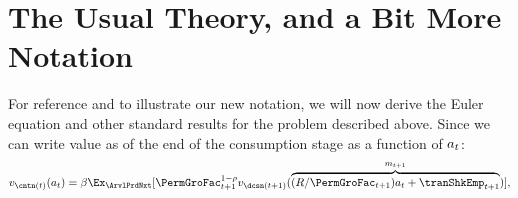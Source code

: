 
\hypertarget{the-usual-theory}{}
\section{The Usual Theory, and a Bit More Notation}\label{sec:the-usual-theory}


For reference and to illustrate our new notation, we will now derive the Euler equation and other standard results for the problem described above.
Since we can write value as of the end of the consumption stage as a function of $a_{t}$:
\hypertarget{eq-vCntnExpansion}{}
\begin{equation}\begin{gathered}\begin{aligned}
  \vFunc_{{\cntn}(\prdt)}(\aNrm_{\prdt}) = \DiscFac \Ex_{\ArvlPrdNxt}[\PermGroFac_{\prdt+1}^{1-\CRRA}\vFunc_{\dcsn(\prdt+1)}(\overbrace{(\Rfree / \PermGroFac_{\prdt+1})\aNrm_{\prdt} +\tranShkEmp_{\prdt+1}}^{\mNrm_{\prdt+1}})], \label{eq:vCntnExpansion}
\end{aligned}\end{gathered}\end{equation}

\hypertarget{derivative-notation-convention}{}
